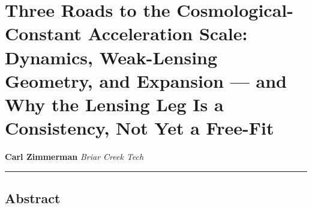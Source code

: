 \documentclass[
]{article}
\author{}
\date{}
\begin{document}
\section{Three Roads to the Cosmological-Constant Acceleration Scale:
Dynamics, Weak-Lensing Geometry, and Expansion --- and Why the Lensing
Leg Is a Consistency, Not Yet a
Free-Fit}\label{three-roads-to-the-cosmological-constant-acceleration-scale-dynamics-weak-lensing-geometry-and-expansion-and-why-the-lensing-leg-is-a-consistency-not-yet-a-free-fit}

\textbf{Carl Zimmerman} \emph{Briar Creek Tech}

\begin{center}\rule{0.5\linewidth}{0.5pt}\end{center}

\subsection{Abstract}\label{abstract}
\end{document}

